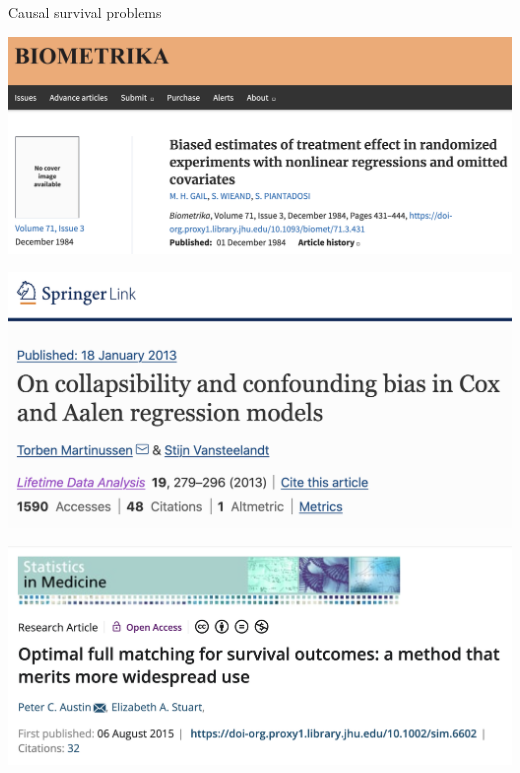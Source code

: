 \documentclass[aspectratio=169,xcolor=dvipsnames]{beamer}					%
\begin{document}
{
\begin{frame}{Causal survival problems}
	\begin{minipage}{\linewidth}
	\vspace*{.07\paperheight}
	\includegraphics[width=0.6\linewidth]{figures/gail_et_al_1984}
	\end{minipage}
	\begin{minipage}{\linewidth}
	\raggedleft
	\vspace*{-.15\paperheight}
	\includegraphics[width=0.45\linewidth]{figures/martinussen_vansteelandt_2013}
	\end{minipage}
	\pause
	\begin{minipage}{\linewidth}
	\centering
	\vspace*{-.6\paperheight}
	\includegraphics[width=0.55\linewidth, frame]{figures/austin_stuart_2015}
	\end{minipage}
\end{frame}
}
\end{document}
